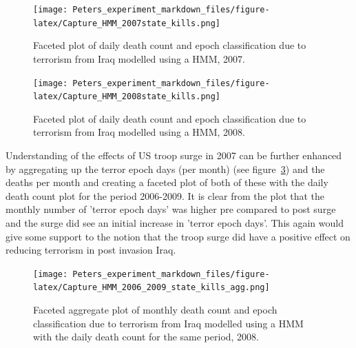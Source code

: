 \begin{figure}[t]
\texttt{[image: Peters\_experiment\_markdown\_files/figure-latex/Capture\_HMM\_2007state\_kills.png]}
\caption{Faceted plot of daily death count and epoch classification due to terrorism from Iraq modelled using a HMM, 2007.}
\label{fig:Rplot02_2007_facstate_HMM}
\centering
\end{figure}

\begin{figure}[t]
\texttt{[image: Peters\_experiment\_markdown\_files/figure-latex/Capture\_HMM\_2008state\_kills.png]}
\caption{Faceted plot of daily death count and epoch classification due to terrorism from Iraq modelled using a HMM, 2008.}
\label{fig:Rplot02_2008_facstate_HMM}
\centering
\end{figure}

Understanding of the effects of US troop surge in 2007 can be further enhanced by aggregating up the terror epoch days (per month) (see figure~\ref{fig:Rplot02_2008_facstate_HMM_agg}) and the deaths per month and creating a faceted plot of both of these with the daily death count plot for the period 2006-2009. It is clear from the plot that the monthly number of 'terror epoch days' was higher pre compared to post surge and the surge did see an initial increase in 'terror epoch days'. This again would give some support to the notion that the troop surge did have a positive effect on reducing terrorism in post invasion Iraq.

\begin{figure}[t]
\texttt{[image: Peters\_experiment\_markdown\_files/figure-latex/Capture\_HMM\_2006\_2009\_state\_kills\_agg.png]}
\caption{Faceted aggregate plot of monthly death count and epoch classification due to terrorism from Iraq modelled using a HMM with the daily death count for the same period, 2008.}
\label{fig:Rplot02_2008_facstate_HMM_agg}
\centering
\end{figure}


